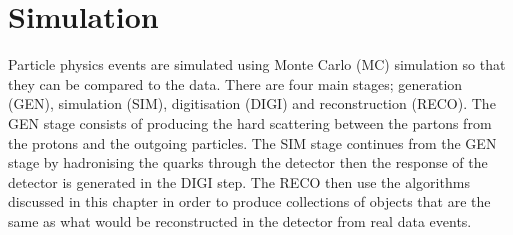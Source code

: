 \section{Simulation}
Particle physics events are simulated using Monte Carlo (MC) simulation so that they can be compared to the data. There are four main stages; generation (GEN), simulation (SIM), digitisation (DIGI) and reconstruction (RECO). The GEN stage consists of producing the hard scattering between the partons from the protons and the outgoing particles. The SIM stage continues from the GEN stage by hadronising the quarks through the detector then the response of the detector is generated in the DIGI step. The RECO then use the algorithms discussed in this chapter in order to produce collections of objects that are the same as what would be reconstructed in the detector from real data events.


